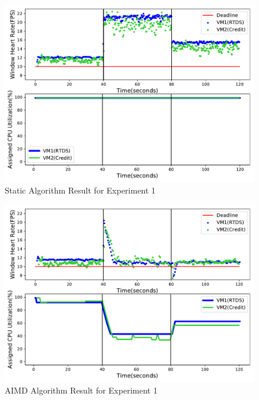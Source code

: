 \begin{figure}[h!]
\centering
\includegraphics[width=1\linewidth]{images/1vm_static}
\caption{Static Algorithm Result for Experiment 1}
\label{1vm_static}
\end{figure}

\begin{figure}[h!]
\centering
\includegraphics[width=1\linewidth]{images/1vm_aimd}
\caption{AIMD Algorithm Result for Experiment 1}
\label{1vm_aimd}
\end{figure}

